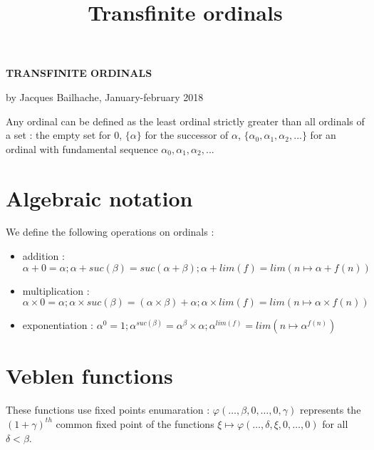 \documentclass[8pt]{article}
\title{Transfinite ordinals}
\begin{document}
\setlength{\parindent}{0pt}

\vspace{-0.4cm}

\begin{center}
\textbf{TRANSFINITE ORDINALS}

by Jacques Bailhache, January-february 2018
\end{center}

\vspace{-0.2cm}
Any ordinal can be defined as the least ordinal strictly greater than all ordinals of a set : the empty set for 0, \(\lbrace \alpha \rbrace\) for the successor of \( \alpha \),  \(\lbrace \alpha_0,\alpha_1,\alpha_2,...\rbrace\) for an ordinal with fundamental sequence \(\alpha_0, \alpha_1, \alpha_2, ...\)

\vspace{-0.7cm}

\section{Algebraic notation}
\vspace{-0.4cm}
We define the following operations on ordinals :
\vspace{-0.4cm}
\smallskip
\begin{itemize}
     \setlength{\itemsep}{1pt}
     \setlength{\parskip}{0pt}
     \setlength{\parsep}{0pt}
\item addition : \( \alpha+0=\alpha ; \alpha+suc(\beta)=suc(\alpha+\beta); \alpha+lim(f)=lim(n \mapsto \alpha+f(n)) \)
\vspace{-0.1cm}
\item multiplication : \( \alpha \times 0 = \alpha ; \alpha \times suc(\beta) = (\alpha \times \beta) + \alpha ; \alpha \times lim(f) = lim (n \mapsto \alpha \times f(n)) \)
\vspace{-0.1cm}
\item exponentiation : \( \alpha^0 = 1 ; \alpha^{suc(\beta)} = \alpha^\beta \times \alpha ; \alpha^{lim(f)} = lim (n \mapsto \alpha^{f(n)}) \)
\end{itemize}
\vspace{-0.8cm}

\section{Veblen functions}
\vspace{-0.4cm}
These functions use fixed points enumaration : \(\varphi(\ldots,\beta,0,\ldots,0,\gamma) \) represents the \((1+\gamma)^{th}\) common fixed point of the functions \( \xi \mapsto \varphi(\ldots,\delta,\xi,0,\ldots,0)\) for all \(\delta < \beta\).
\vspace{-0.6cm}
\end{document}
